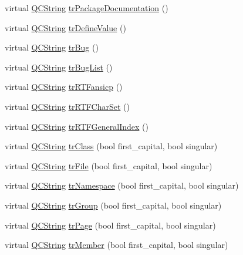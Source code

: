 \begin{DoxyCompactItemize}
\item 
virtual \hyperlink{class_q_c_string}{Q\-C\-String} \hyperlink{class_translator_polish_a81182b49f7e9863a79369c395e7adcf5}{tr\-Package\-Documentation} ()
\item 
virtual \hyperlink{class_q_c_string}{Q\-C\-String} \hyperlink{class_translator_polish_ae6be6e403011f5b069dde07447839f9e}{tr\-Define\-Value} ()
\item 
virtual \hyperlink{class_q_c_string}{Q\-C\-String} \hyperlink{class_translator_polish_abfa1d6c97f4c2967ebbd515db5590ec6}{tr\-Bug} ()
\item 
virtual \hyperlink{class_q_c_string}{Q\-C\-String} \hyperlink{class_translator_polish_a6922767c9b6ff214503967c6f8b66468}{tr\-Bug\-List} ()
\item 
virtual \hyperlink{class_q_c_string}{Q\-C\-String} \hyperlink{class_translator_polish_ac711f1a109c3c8131bf02a9ff6f48e36}{tr\-R\-T\-Fansicp} ()
\item 
virtual \hyperlink{class_q_c_string}{Q\-C\-String} \hyperlink{class_translator_polish_af3bba50fd4e382b113171e132e88719b}{tr\-R\-T\-F\-Char\-Set} ()
\item 
virtual \hyperlink{class_q_c_string}{Q\-C\-String} \hyperlink{class_translator_polish_a6a04ffa0f1114981e258cf0a94478c98}{tr\-R\-T\-F\-General\-Index} ()
\item 
virtual \hyperlink{class_q_c_string}{Q\-C\-String} \hyperlink{class_translator_polish_a2b5bc0be4e846d4ee6e3430ddeb3cf53}{tr\-Class} (bool first\-\_\-capital, bool singular)
\item 
virtual \hyperlink{class_q_c_string}{Q\-C\-String} \hyperlink{class_translator_polish_abb09819793310c18e4b39a4691b8e681}{tr\-File} (bool first\-\_\-capital, bool singular)
\item 
virtual \hyperlink{class_q_c_string}{Q\-C\-String} \hyperlink{class_translator_polish_a5e5011ab1245fd64707347dae129c574}{tr\-Namespace} (bool first\-\_\-capital, bool singular)
\item 
virtual \hyperlink{class_q_c_string}{Q\-C\-String} \hyperlink{class_translator_polish_a2825eb7956ddf759028c8957352e627d}{tr\-Group} (bool first\-\_\-capital, bool singular)
\item 
virtual \hyperlink{class_q_c_string}{Q\-C\-String} \hyperlink{class_translator_polish_a719e433b483932299fd17e751decdfb2}{tr\-Page} (bool first\-\_\-capital, bool singular)
\item 
virtual \hyperlink{class_q_c_string}{Q\-C\-String} \hyperlink{class_translator_polish_aaded5c915d8cd335abcd0e65e535cd71}{tr\-Member} (bool first\-\_\-capital, bool singular)

\end{DoxyCompactItemize}
